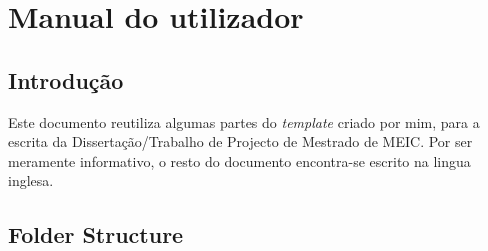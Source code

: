 % 
%  
%
\chapter{Manual do utilizador}
\label{cha:users_manual}

\section{Introdução} %
\label{sec:introduction}
Este documento reutiliza algumas partes do \textit{template} criado por mim, para a escrita da Dissertação/Trabalho de Projecto de Mestrado de MEIC. Por ser meramente informativo, o resto do documento encontra-se escrito na lingua inglesa.


\section{Folder Structure} %
\label{sec:folder_structure}

